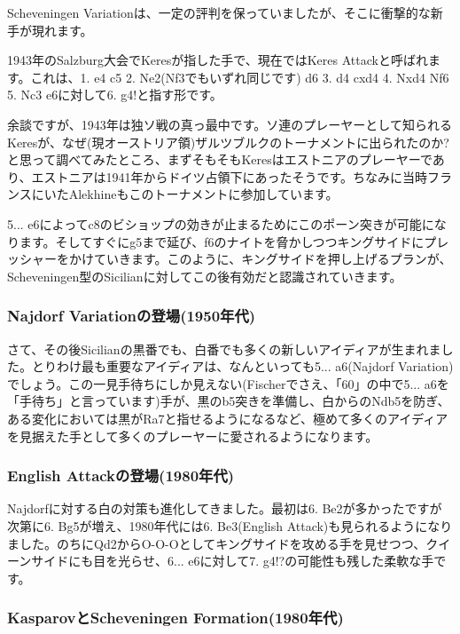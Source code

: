 Scheveningen Variationは、一定の評判を保っていましたが、そこに衝撃的な新手が現れます。

1943年のSalzburg大会でKeresが指した手で、現在ではKeres Attackと呼ばれます。これは、1. e4 c5 2. Ne2(Nf3でもいずれ同じです) d6 3. d4 cxd4 4. Nxd4 Nf6 5. Nc3 e6に対して6. g4!と指す形です。

余談ですが、1943年は独ソ戦の真っ最中です。ソ連のプレーヤーとして知られるKeresが、なぜ(現オーストリア領)ザルツブルクのトーナメントに出られたのか?と思って調べてみたところ、まずそもそもKeresはエストニアのプレーヤーであり、エストニアは1941年からドイツ占領下にあったそうです。ちなみに当時フランスにいたAlekhineもこのトーナメントに参加しています。

5... e6によってc8のビショップの効きが止まるためにこのポーン突きが可能になります。そしてすぐにg5まで延び、f6のナイトを脅かしつつキングサイドにプレッシャーをかけていきます。このように、キングサイドを押し上げるプランが、Scheveningen型のSicilianに対してこの後有効だと認識されていきます。

\subsubsection{Najdorf Variationの登場(1950年代)}

さて、その後Sicilianの黒番でも、白番でも多くの新しいアイディアが生まれました。とりわけ最も重要なアイディアは、なんといっても5... a6(Najdorf Variation)でしょう。この一見手待ちにしか見えない(Fischerでさえ、「60」の中で5... a6を「手待ち」と言っています)手が、黒のb5突きを準備し、白からのNdb5を防ぎ、ある変化においては黒がRa7と指せるようになるなど、極めて多くのアイディアを見据えた手として多くのプレーヤーに愛されるようになります。

\subsubsection{English Attackの登場(1980年代)}

Najdorfに対する白の対策も進化してきました。最初は6. Be2が多かったですが次第に6. Bg5が増え、1980年代には6. Be3(English Attack)も見られるようになりました。のちにQd2からO-O-Oとしてキングサイドを攻める手を見せつつ、クイーンサイドにも目を光らせ、6... e6に対して7. g4!?の可能性も残した柔軟な手です。

\subsubsection{KasparovとScheveningen Formation(1980年代)}

